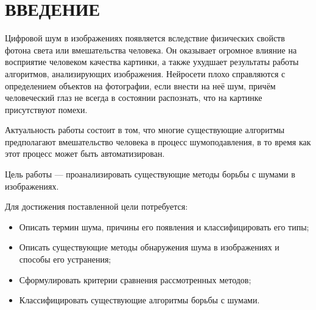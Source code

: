 \section*{ВВЕДЕНИЕ}
Цифровой шум в изображениях появляется вследствие физических свойств фотона света или вмешательства человека.
Он оказывает огромное влияние на восприятие человеком качества картинки, а также ухудшает результаты работы алгоритмов, анализирующих изображения. 
Нейросети плохо справляются с определением объектов на фотографии, если внести на неё шум, причём человеческий глаз не всегда в состоянии распознать, что на картинке присутствуют помехи.

Актуальность работы состоит в том, что многие существующие алгоритмы предполагают вмешательство человека в процесс шумоподавления, в то время как этот процесс может быть автоматизирован.

Цель работы --- проанализировать существующие методы борьбы с шумами в изображениях.

Для достижения поставленной цели потребуется:
\begin{itemize}
\item Описать термин шума, причины его появления и классифицировать его типы;
\item Описать существующие методы обнаружения шума в изображениях и способы его устранения;
\item Сформулировать критерии сравнения рассмотренных методов;
\item Классифицировать существующие алгоритмы борьбы с шумами.
\end{itemize}

